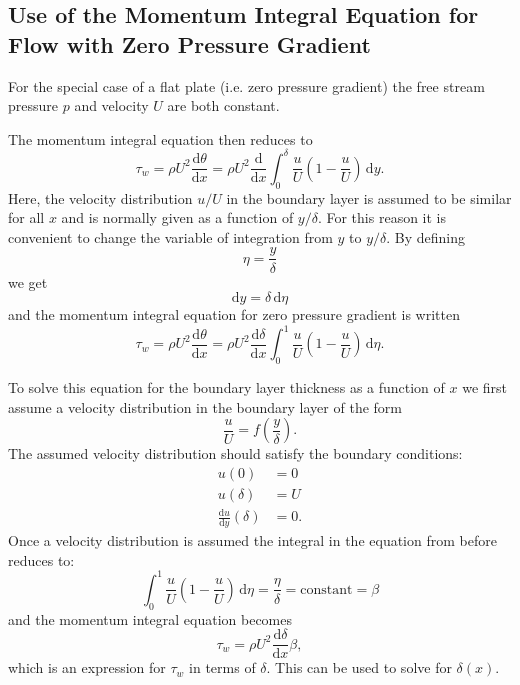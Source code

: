\subsection{Use of the Momentum Integral Equation for Flow with Zero Pressure Gradient} \label{sec:flatplate}
For the special case of a flat plate (i.e. zero pressure gradient) the free stream pressure $p$ and velocity $U$ are both constant.

The momentum integral equation then reduces to
\[ 
\tau_w = \rho U^2 \frac{\mathrm{d}\theta}{\mathrm{d}x} = \rho U^2 \frac{\mathrm{d}}{\mathrm{d}x} \int_{0}^{\delta} \frac{u}{U} \left( 1 - \frac{u}{U} \right)\, \mathrm{d}y 
.\]
Here, the velocity distribution $u / U$ in the boundary layer is assumed to be similar for all $x$ and is normally given as a function of $y / \delta$.
For this reason it is convenient to change the variable of integration from $y$ to $y / \delta$.
By defining
\[ 
\eta = \frac{y}{\delta}
\]
we get
\[ 
\mathrm{d}y = \delta \, \mathrm{d}\eta
\]
and the momentum integral equation for zero pressure gradient is written
\[ 
\tau_w = \rho U^2 \frac{\mathrm{d}\theta}{\mathrm{d}x} = \rho U^2 \frac{\mathrm{d}\delta}{\mathrm{d}x} \int_{0}^{1} \frac{u}{U} \left( 1 - \frac{u}{U} \right)\, \mathrm{d}\eta
.\]

To solve this equation for the boundary layer thickness as a function of $x$ we first assume a velocity distribution in the boundary layer of the form
\[ 
\frac{u}{U} = f \left( \frac{y}{\delta} \right)
.\]
The assumed velocity distribution should satisfy the boundary conditions:
\begin{align*}
  u(0) &= 0 \\
  u(\delta) &= U \\
  \frac{\mathrm{d}u}{\mathrm{d}y} (\delta) &= 0
.\end{align*}
Once a velocity distribution is assumed the integral in the equation from before reduces to:
\[ 
\int_{0}^{1} \frac{u}{U} \left( 1 - \frac{u}{U} \right)\, \mathrm{d}\eta = \frac{\eta}{\delta} = \mathrm{constant} = \beta
\]
and the momentum integral equation becomes
\[ 
\tau_w = \rho U^2 \frac{\mathrm{d}\delta}{\mathrm{d}x} \beta
,\]
which is an expression for $\tau_w$ in terms of $\delta$.
This can be used to solve for $\delta(x)$.

